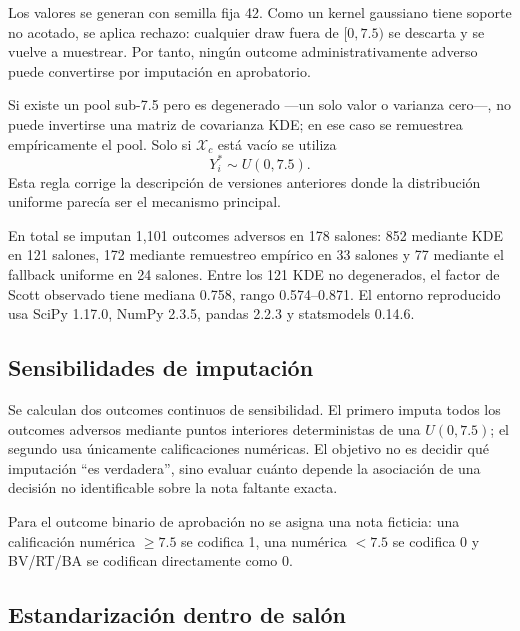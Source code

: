 \documentclass[11pt,letterpaper]{article}
\begin{document}
Los valores se generan con semilla fija 42. Como un kernel gaussiano tiene soporte no acotado, se aplica rechazo: cualquier draw fuera de $[0,7.5)$ se descarta y se vuelve a muestrear. Por tanto, ningún outcome administrativamente adverso puede convertirse por imputación en aprobatorio.

Si existe un pool sub-7.5 pero es degenerado ---un solo valor o varianza cero---, no puede invertirse una matriz de covarianza KDE; en ese caso se remuestrea empíricamente el pool. Solo si $\mathcal X_c$ está vacío se utiliza
\[
Y_i^*\sim U(0,7.5).
\]
Esta regla corrige la descripción de versiones anteriores donde la distribución uniforme parecía ser el mecanismo principal.

\begin{table}[H]
\centering
\caption{Método de imputación efectivamente utilizado en los salones con outcomes adversos}

\end{table}

En total se imputan 1,101 outcomes adversos en 178 salones: 852 mediante KDE en 121 salones, 172 mediante remuestreo empírico en 33 salones y 77 mediante el fallback uniforme en 24 salones. Entre los 121 KDE no degenerados, el factor de Scott observado tiene mediana 0.758, rango 0.574--0.871. El entorno reproducido usa SciPy 1.17.0, NumPy 2.3.5, pandas 2.2.3 y statsmodels 0.14.6.

\subsection{Sensibilidades de imputación}

Se calculan dos outcomes continuos de sensibilidad. El primero imputa todos los outcomes adversos mediante puntos interiores deterministas de una $U(0,7.5)$; el segundo usa únicamente calificaciones numéricas. El objetivo no es decidir qué imputación ``es verdadera'', sino evaluar cuánto depende la asociación de una decisión no identificable sobre la nota faltante exacta.

Para el outcome binario de aprobación no se asigna una nota ficticia: una calificación numérica $\ge7.5$ se codifica 1, una numérica $<7.5$ se codifica 0 y BV/RT/BA se codifican directamente como 0.

\subsection{Estandarización dentro de salón}
\end{document}
